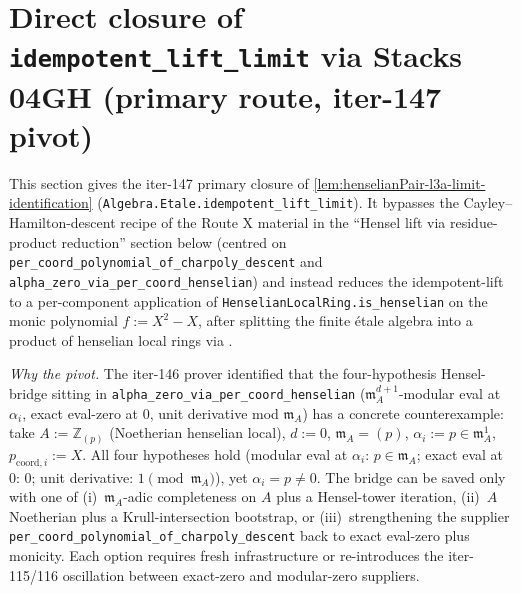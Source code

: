 
\section{Direct closure of \texttt{idempotent\_lift\_limit} via Stacks 04GH (primary route, iter-147 pivot)}

This section gives the iter-147 primary closure of
\cref{lem:henselianPair-l3a-limit-identification}
(\texttt{Algebra.Etale.idempotent\_lift\_limit}). It bypasses the
Cayley--Hamilton-descent recipe of the Route X material in the
``Hensel lift via residue-product reduction'' section below
(centred on
\texttt{per\_coord\_polynomial\_of\_charpoly\_descent} and
\texttt{alpha\_zero\_via\_per\_coord\_henselian}) and instead reduces
the idempotent-lift to a per-component application of
\texttt{HenselianLocalRing.is\_henselian} on the monic polynomial
$f := X^2 - X$, after splitting the finite étale algebra into a
product of henselian local rings via .

\emph{Why the pivot.} The iter-146 prover identified that the
four-hypothesis Hensel-bridge sitting in
\texttt{alpha\_zero\_via\_per\_coord\_henselian}
($\mathfrak m_A^{d+1}$-modular eval at $\alpha_i$, exact eval-zero
at $0$, unit derivative mod $\mathfrak m_A$) has a concrete
counterexample: take $A := \mathbb{Z}_{(p)}$ (Noetherian henselian
local), $d := 0$, $\mathfrak m_A = (p)$, $\alpha_i := p \in
\mathfrak m_A^{1}$, $p_{\mathrm{coord},i} := X$. All four
hypotheses hold (modular eval at $\alpha_i$: $p \in \mathfrak m_A$;
exact eval at $0$: $0$; unit derivative: $1 \pmod{\mathfrak m_A}$),
yet $\alpha_i = p \neq 0$. The bridge can be saved only with one
of (i)~$\mathfrak m_A$-adic completeness on $A$ plus a Hensel-tower
iteration, (ii)~$A$ Noetherian plus a Krull-intersection bootstrap,
or (iii)~strengthening the supplier
\texttt{per\_coord\_polynomial\_of\_charpoly\_descent} back to
exact eval-zero plus monicity. Each option requires fresh
infrastructure or re-introduces the iter-115/116 oscillation
between exact-zero and modular-zero suppliers.

